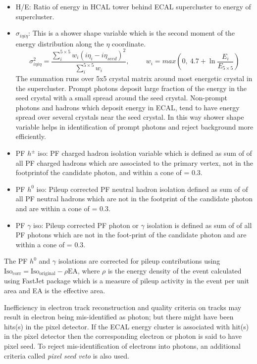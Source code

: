 \begin{itemize}
\item H/E: Ratio of energy in HCAL tower behind ECAL supercluster to energy of supercluster.
\item $\sigma_{i\eta i\eta}$: This is a shower shape variable which is the second moment of the energy distribution along the $\eta$ coordinate.
\begin{equation}
\sigma_{i\eta i\eta}^2 = \frac{\sum\limits_{i}^{5\times5}w_i(i\eta_i-i\eta_{seed})^2}{\sum\limits_{i}^{5\times5}w_i}, \hspace{1cm}
w_i = max(0,\ 4.7+\ln\frac{E_i}{E_{5\times5}})
\end{equation}
The summation runs over 5x5 crystal matrix around most energetic crystal in the supercluster. Prompt photons deposit large fraction
of the energy in the seed crystal with a small spread around the seed crystal. Non-prompt photons and hadrons which deposit energy in 
ECAL, tend to have energy spread over several crystals near the seed crystal. In this way shower shape variable helps in identification of
prompt photons and reject background more efficiently.
\item PF $h^\pm$ iso: PF charged hadron isolation variable which is defined as sum of \pt of all PF charged hadrons which are
associated to the primary vertex, not in the footprint\footnotemark of the candidate photon, and within a cone of \dR = 0.3.
\item PF $h^0$ iso: Pileup corrected PF neutral hadron isolation defined as sum of \et of all PF neutral hadrons which are not in the 
footprint of the candidate photon and are within a cone of \dR = 0.3.
\item PF $\gamma$ iso: Pileup corrected PF photon or $\gamma$ isolation is defined as sum of \et of all PF photons which are not in the 
foot-print of
the candidate photon and are within a cone of \dR = 0.3.
\end{itemize}
The PF $h^0$ and $\gamma$ isolations are corrected for pileup contributions using $\mathrm{Iso}_{\mathrm{corr}} = 
\mathrm{Iso}_{\mathrm{original}} - \rho\mathrm{EA}$, where $\rho$ is the energy density of the event calculated using FastJet package 
\cite{Cacciari:2011ma} which is a measure of pileup activity in the event per unit area and EA is the effective area.

Inefficiency in electron track reconstruction and quality criteria on tracks may result in electron being mis-identified as photon; 
but there might have been hits(s) in the pixel detector. If the ECAL energy cluster is associated with hit(s) in the pixel detector then 
the corresponding electron or photon is said to have pixel seed. To reject mis-identification of electrons into photons, an additional 
criteria called \textit{pixel seed veto} is also used. 

